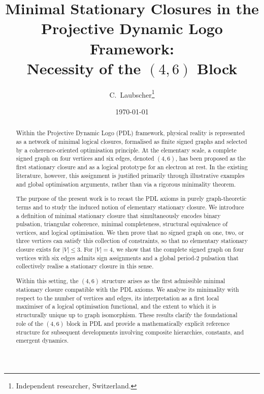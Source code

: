 \documentclass[11pt,a4paper]{article}
\theoremstyle{definition}
\begin{document}
\title{Minimal Stationary Closures in the\\
Projective Dynamic Logo Framework:\\
Necessity of the \((4,6)\) Block}

\author{C.~Laubscher\thanks{Independent researcher, Switzerland.}\\[4pt]}

\date{\small \today}

\maketitle

\begin{abstract}
Within the Projective Dynamic Logo (PDL) framework, physical reality is represented as a network of minimal logical closures, formalised as finite signed graphs and selected by a coherence-oriented optimisation principle.\cite{PDL_Intro_2026,PDL_Main_2026,PDL_French_2026} At the elementary scale, a complete signed graph on four vertices and six edges, denoted $(4,6)$, has been proposed as the first stationary closure and as a logical prototype for an electron at rest.\cite{PDL_Intro_2026,PDL_Main_2026} In the existing literature, however, this assignment is justified primarily through illustrative examples and global optimisation arguments, rather than via a rigorous minimality theorem.
\par
The purpose of the present work is to recast the PDL axioms in purely graph-theoretic terms and to study the induced notion of elementary stationary closure. We introduce a definition of minimal stationary closure that simultaneously encodes binary pulsation, triangular coherence, minimal completeness, structural equivalence of vertices, and logical optimisation.\cite{PDL_Intro_2026,PDL_Main_2026,PDL_TO_Dialogue_2026} We then prove that no signed graph on one, two, or three vertices can satisfy this collection of constraints, so that no elementary stationary closure exists for $|V|\leq 3$. For $|V|=4$, we show that the complete signed graph on four vertices with six edges admits sign assignments and a global period-$2$ pulsation that collectively realise a stationary closure in this sense.\cite{PDL_Main_2026}
\par
Within this setting, the $(4,6)$ structure arises as the first admissible minimal stationary closure compatible with the PDL axioms. We analyse its minimality with respect to the number of vertices and edges, its interpretation as a first local maximiser of a logical optimisation functional, and the extent to which it is structurally unique up to graph isomorphism. These results clarify the foundational role of the $(4,6)$ block in PDL and provide a mathematically explicit reference structure for subsequent developments involving composite hierarchies, constants, and emergent dynamics.\cite{PDL_Intro_2026,PDL_Main_2026,PDL_Global_Mapping_2026}
\end{abstract}
\end{document}
